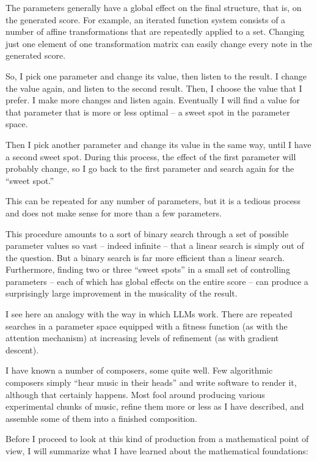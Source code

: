 \documentclass[11pt]{scrartcl}
\begin{document}
The parameters generally have a global effect on the final structure, that is, on the generated score. For example, an iterated function system consists of a number of affine transformations that are repeatedly applied to a set. Changing just one element of one transformation matrix can easily change every note in the generated score.

So, I pick one parameter and change its value, then listen to the result. I change the value again, and listen to the second result. Then, I choose the value that I prefer. I make more changes and listen again. Eventually I will find a value for that parameter that is more or less optimal – a sweet spot in the parameter space.

Then I pick another parameter and change its value in the same way, until I have a second sweet spot. During this process, the effect of the first parameter will probably change, so I go back to the first parameter and search again for the “sweet spot.”

This can be repeated for any number of parameters, but it is a tedious process and does not make sense for more than a few parameters.

This procedure amounts to a sort of binary search through a set of possible parameter values so vast – indeed infinite – that a linear search is simply out of the question. But a binary search is far more efficient than a linear search. Furthermore, finding two or three ``sweet spots'' in a small set of controlling parameters – each of which has global effects on the entire score – can produce a surprisingly large improvement in the musicality of the result.

I see here an analogy with the way in which LLMs work. There are repeated searches in a parameter space equipped with a fitness function (as with the attention mechanism) at increasing levels of refinement (as with gradient descent).

I have known a number of composers, some quite well. Few algorithmic composers simply ``hear music in their heads'' and write software to render it, although that certainly happens. Most fool around producing various experimental chunks of music, refine them more or less as I have described, and assemble some of them into a finished composition.

Before I proceed to look at this kind of production from a mathematical point of view, I will summarize what I have learned about the mathematical foundations:
\end{document}
